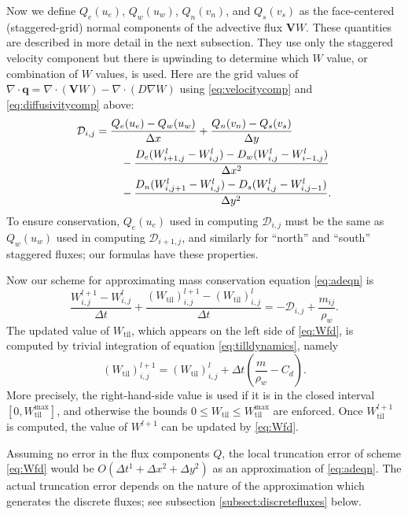 \documentclass[gmd]{copernicus}   %
\newcommand{\text}{\textrm}
\newcommand\bV{\mathbf{V}}
\newcommand\bq{\mathbf{q}}
\newcommand{\Div}{\nabla\cdot}
\newcommand{\grad}{\nabla}
\newcommand{\Wtil}{W_{\text{til}}}
\newcommand{\Wtilmax}{W_{\text{til}}^{\text{max}}}
\newcommand{\Wlij}{W^l_{i,j}}
\begin{document}
Now we define $Q_e(u_e)$, $Q_w(u_w)$, $Q_n(v_n)$, and $Q_s(v_s)$ as the face-centered (staggered-grid) normal components of the advective flux $\bV W$.  These quantities are described in more detail in the next subsection.  They use only the staggered velocity component but there is upwinding to determine which $W$ value, or combination of $W$ values, is used.  Here are the grid values of $\Div \bq = \Div (\bV W) - \Div (D \grad W)$ using \eqref{eq:velocitycomp} and \eqref{eq:diffusivitycomp} above:
\begin{align}
&\mathcal{D}_{i,j} =  \frac{Q_e(u_e) - Q_w(u_w)}{\Delta x} + \frac{Q_n(v_n) - Q_s(v_s)}{\Delta y}  \label{eq:fluxdivgrid} \\
&\qquad \qquad - \frac{D_e (W_{i+1,j}^l - \Wlij) - D_w (\Wlij - W_{i-1,j}^l)}{\Delta x^2} \notag \\
&\qquad \qquad - \frac{D_n (W_{i,j+1}^l - \Wlij) - D_s (\Wlij - W_{i,j-1}^l)}{\Delta y^2}.  \notag
\end{align}
To ensure conservation, $Q_e(u_e)$ used in computing $\mathcal{D}_{i,j}$ must be the same as $Q_w(u_w)$ used in computing $\mathcal{D}_{i+1,j}$, and similarly for ``north'' and ``south'' staggered fluxes; our formulas have these properties.

Now our scheme for approximating mass conservation equation \eqref{eq:adeqn} is
\begin{equation}
\frac{W_{i,j}^{l+1} - W_{i,j}^l}{\Delta t} + \frac{(\Wtil)_{i,j}^{l+1} - (\Wtil)_{i,j}^l}{\Delta t} = - \mathcal{D}_{i,j} + \frac{m_{ij}}{\rho_w}.    \label{eq:Wfd}
\end{equation}
The updated value of $\Wtil$, which appears on the left side of \eqref{eq:Wfd}, is computed by trivial integration of equation \eqref{eq:tilldynamics}, namely
\begin{equation}
(\Wtil)_{i,j}^{l+1} = (\Wtil)_{i,j}^l + \Delta t \left(\frac{m}{\rho_w} - C_d\right).  \label{eq:tillupdatefd}
\end{equation}
More precisely, the right-hand-side value is used if it is in the closed interval $[0,\Wtilmax]$, and otherwise the bounds $0\le \Wtil \le \Wtilmax$ are enforced.  Once $\Wtil^{l+1}$ is computed, the value of $W^{l+1}$ can be updated by \eqref{eq:Wfd}.

Assuming no error in the flux components $Q$, the local truncation error \citep{MortonMayers} of scheme \eqref{eq:Wfd} would be $O(\Delta t^1 + \Delta x^2 + \Delta y^2)$ as an approximation of \eqref{eq:adeqn}.  The actual truncation error depends on the nature of the approximation which generates the discrete fluxes; see subsection \ref{subsect:discretefluxes} below.
\end{document}
